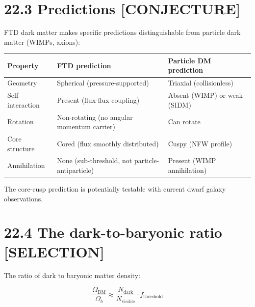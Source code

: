 \documentclass[
  11pt,
  letterpaper,
  twoside,
  openright]{book}
\begin{document}
\section{22.3 Predictions
{[}CONJECTURE{]}}\label{predictions-conjecture}

FTD dark matter makes specific predictions distinguishable from particle
dark matter (WIMPs, axions):

\begin{longtable}[]{@{}
  >{\raggedright\arraybackslash}p{}
  >{\raggedright\arraybackslash}p{}
  >{\raggedright\arraybackslash}p{}@{}}
\toprule\noalign{}
\begin{minipage}[b]{\linewidth}\raggedright
Property
\end{minipage} & \begin{minipage}[b]{\linewidth}\raggedright
FTD prediction
\end{minipage} & \begin{minipage}[b]{\linewidth}\raggedright
Particle DM prediction
\end{minipage} \\
\midrule\noalign{}
\endhead
\bottomrule\noalign{}
\endlastfoot
Geometry & Spherical (pressure-supported) & Triaxial (collisionless) \\
Self-interaction & Present (flux-flux coupling) & Absent (WIMP) or weak
(SIDM) \\
Rotation & Non-rotating (no angular momentum carrier) & Can rotate \\
Core structure & Cored (flux smoothly distributed) & Cuspy (NFW
profile) \\
Annihilation & None (sub-threshold, not particle-antiparticle) & Present
(WIMP annihilation) \\
\end{longtable}

The core-cusp prediction is potentially testable with current dwarf
galaxy observations.

\section{22.4 The dark-to-baryonic ratio
{[}SELECTION{]}}\label{the-dark-to-baryonic-ratio-selection}

The ratio of dark to baryonic matter density:

\[
\frac{\Omega_{\text{DM}}}{\Omega_b} \approx \frac{N_{\text{dark}}}{N_{\text{visible}}} \cdot f_{\text{threshold}}
\tag{22.1}
\]
\end{document}
